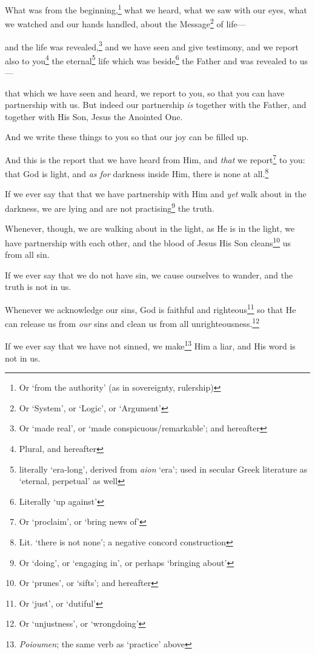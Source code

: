 \documentclass[article]{memoir}%
\newcounter{vnum}
\renewcommand*{\chapter}{
	\vspace{\baselineskip}
	\settowidth{\chapindent}{\chapnumfont 999}
	\noindent\llap{\makebox[\chapindent][l]{%
		\chapnumfont \thechapter}}%
	\addtocounter{chapter}{1}
	\setcounter{vnum}{1}
}
\newcommand{\vnum}{%
	\textsuperscript{\thevnum}%
	\addtocounter{vnum}{1}%
}
\newcommand{\infer}[1]{\textit{#1}}
\newcommand{\focus}[1]{{#1}}
\newcommand{\lxx}[2]{\textit{#1} `#2'}
\renewcommand*{\book}[1]{%
	\makebox[\textwidth][c]{\centering \booktitlefont #1}%
	\setcounter{chapter}{1}
}
\begin{document}
\book{1 John}
	
\chapter{} \vnum What was from the beginning,\footnote{Or ‘from the authority’ (as in sovereignty, rulership)} what we heard, what we saw with our eyes, what we watched and our hands handled, about the Message\footnote{Or ‘System’, or ‘Logic’, or ‘Argument’} of life---\vnum and the life was revealed,\footnote{Or `made real', or `made conspicuous/remarkable'; and hereafter} and we have seen and give testimony, and we report also to you\footnote{Plural, and hereafter} the eternal\footnote{literally `era-long', derived from \lxx{aion}{era}; used in secular Greek literature as `eternal, perpetual' as well} life which was beside\footnote{Literally ‘up against’} the Father and was revealed to us---\vnum that which we have seen and heard, we report to you, so that you can have partnership with us. But indeed our partnership \infer{is} together with the Father, and together with His Son, Jesus the Anointed One. \vnum And we write these things to you so that our joy can be filled up.

\vnum And \focus{this} is the report that we have heard from Him, and \infer{that} we report\footnote{Or `proclaim', or `bring news of'} to you: that God is light, and \infer{as for} darkness inside Him, there is none at all.\footnote{Lit. `there is not none'; a negative concord construction} \vnum If we ever say that that we have partnership with Him and \infer{yet} walk about in the darkness, we are lying and are not practising\footnote{Or `doing', or `engaging in', or perhaps `bringing about'} the truth. \vnum Whenever, though, we are walking about in the light, as He is in the light, we have partnership with each other, and the blood of Jesus His Son cleans\footnote{Or `prunes', or `sifts'; and hereafter} us from all sin. \vnum If we ever say that we do not have sin, we cause ourselves to wander, and the truth is not in us. \vnum Whenever we acknowledge our sins, God is faithful and righteous\footnote{Or `just', or `dutiful'} so that He can release us from \infer{our} sins and clean us from all unrighteousness.\footnote{Or `unjustness', or `wrongdoing'} \vnum If we ever say that we have not sinned, we make\footnote{\textit{Poioumen}; the same verb as `practice' above} Him a liar, and His word is not in us.
\end{document}
